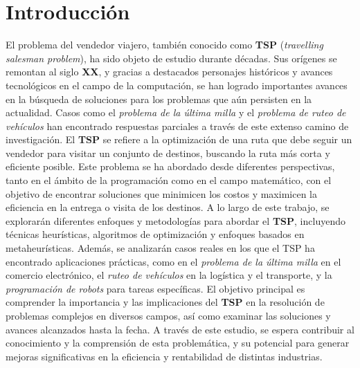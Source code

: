 \setcounter{page}{1}
\titleformat{\chapter}[display]
    {\normalfont\Large\bfseries}{\filleft\chaptertitlename\ \thechapter}{20pt}{\Huge}    
\chapter{Introducción}
    El problema del vendedor viajero, también conocido como \textbf{TSP} (\textit{travelling salesman problem}), ha sido objeto de estudio durante décadas. Sus orígenes se remontan al siglo \textbf{XX}, y gracias a destacados personajes históricos y avances tecnológicos en el campo de la computación, se han logrado importantes avances en la búsqueda de soluciones para los problemas que aún persisten en la actualidad. Casos como el \textit{problema de la última milla} y el \textit{problema de ruteo de vehículos} han encontrado respuestas parciales a través de este extenso camino de investigación.
    \newline
    \newline
    El \textbf{TSP} se refiere a la optimización de una ruta que debe seguir un vendedor para visitar un conjunto de destinos, buscando la ruta más corta y eficiente posible. Este problema se ha abordado desde diferentes perspectivas, tanto en el ámbito de la programación como en el campo matemático, con el objetivo de encontrar soluciones que minimicen los costos y maximicen la eficiencia en la entrega o visita de los destinos.
    \newline
    \newline
    A lo largo de este trabajo, se explorarán diferentes enfoques y metodologías para abordar el \textbf{TSP}, incluyendo técnicas heurísticas, algoritmos de optimización y enfoques basados en metaheurísticas. Además, se analizarán casos reales en los que el TSP ha encontrado aplicaciones prácticas, como en el \textit{problema de la última milla} en el comercio electrónico, el \textit{ruteo de vehículos} en la logística y el transporte, y la \textit{programación de robots} para tareas específicas.
    \newline
    \newline
    El objetivo principal es comprender la importancia y las implicaciones del \textbf{TSP} en la resolución de problemas complejos en diversos campos, así como examinar las soluciones y avances alcanzados hasta la fecha. A través de este estudio, se espera contribuir al conocimiento y la comprensión de esta problemática, y su potencial para generar mejoras significativas en la eficiencia y rentabilidad de distintas industrias.